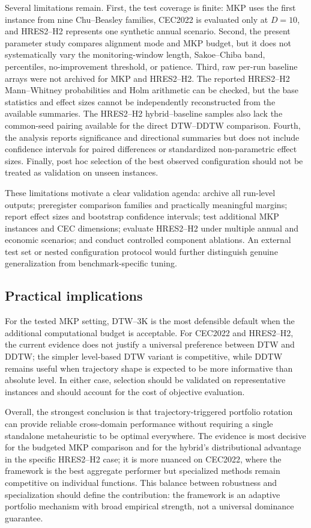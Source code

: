 Several limitations remain. First, the test coverage is finite: MKP uses the
first instance from nine Chu--Beasley families, CEC2022 is evaluated only at
$D=10$, and HRES2--H2 represents one synthetic annual scenario. Second, the
present parameter study compares alignment mode and MKP budget, but it does not
systematically vary the monitoring-window length, Sakoe--Chiba band,
percentiles, no-improvement threshold, or patience. Third, raw per-run baseline
arrays were not archived for MKP and HRES2--H2. The reported HRES2--H2
Mann--Whitney probabilities and Holm arithmetic can be checked, but the base
statistics and effect sizes cannot be independently reconstructed from the
available summaries. The HRES2--H2 hybrid--baseline samples also lack the
common-seed pairing available for the direct DTW--DDTW comparison. Fourth, the
analysis reports significance and directional summaries but does not include
confidence intervals for paired differences or standardized non-parametric
effect sizes. Finally, post hoc selection of the best observed configuration
should not be treated as validation on unseen instances.

These limitations motivate a clear validation agenda: archive all run-level
outputs; preregister comparison families and practically meaningful margins;
report effect sizes and bootstrap confidence intervals; test additional MKP
instances and CEC dimensions; evaluate HRES2--H2 under multiple annual and
economic scenarios; and conduct controlled component ablations. An external
test set or nested configuration protocol would further distinguish genuine
generalization from benchmark-specific tuning.

\subsection{Practical implications}
\label{sec:discussion-implications}

For the tested MKP setting, DTW--3K is the most defensible default when the
additional computational budget is acceptable. For CEC2022 and HRES2--H2, the
current evidence does not justify a universal preference between DTW and DDTW;
the simpler level-based DTW variant is competitive, while DDTW remains useful
when trajectory shape is expected to be more informative than absolute level.
In either case, selection should be validated on representative instances and
should account for the cost of objective evaluation.

Overall, the strongest conclusion is that trajectory-triggered portfolio
rotation can provide reliable cross-domain performance without requiring a
single standalone metaheuristic to be optimal everywhere. The evidence is most
decisive for the budgeted MKP comparison and for the hybrid's distributional
advantage in the specific HRES2--H2 case; it is more nuanced on CEC2022, where
the framework is the best aggregate performer but specialized methods remain
competitive on individual functions. This balance between robustness and
specialization should define the contribution: the framework is an adaptive
portfolio mechanism with broad empirical strength, not a universal dominance
guarantee.

